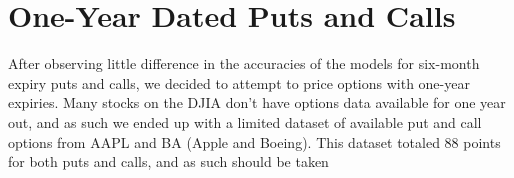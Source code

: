 \section{One-Year Dated Puts and Calls}

After observing little difference in the accuracies of the models for six-month expiry puts and calls, we decided to attempt to price options with one-year expiries. Many stocks on the DJIA don't have options data available for one year out, and as such we ended up with a limited dataset of available put and call options from AAPL and BA (Apple and Boeing). This dataset totaled 88 points for both puts and calls, and as such should be taken 